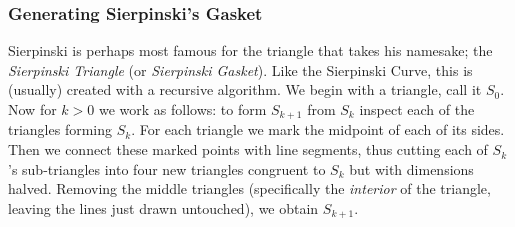 \documentclass[11pt,oneside,final]{article}
\begin{document}
\subsubsection{Generating Sierpinski's Gasket}
Sierpinski is perhaps most famous for the triangle that takes his namesake; the
{\em Sierpinski Triangle} (or {\em Sierpinski Gasket}). Like the Sierpinski
Curve, this is (usually) created with a recursive algorithm. We begin with a
triangle, call it \(S_0\). Now for \(k > 0\) we work as follows: to form
\(S_{k+1}\) from \(S_k\) inspect each of the triangles forming \(S_k\). For
each triangle we mark the midpoint of each of its sides. Then we connect these
marked points with line segments, thus cutting each of \(S_k\)'s sub-triangles
into four new triangles congruent to \(S_k\) but with dimensions halved.
Removing the middle triangles (specifically the {\em interior} of the triangle,
leaving the lines just drawn untouched), we obtain \(S_{k+1}\).\\
\end{document}

